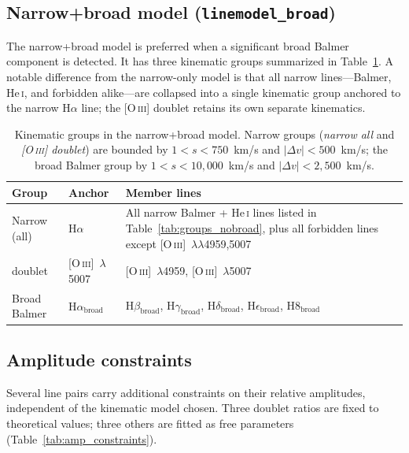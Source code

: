 \documentclass[12pt]{article}
\begin{document}
\subsection{Narrow+broad model (\texttt{linemodel\_broad})}
\label{ssec:broad}

The narrow+broad model is preferred when a significant broad Balmer
component is detected.  It has three kinematic groups summarized in
Table~\ref{tab:groups_broad}.  A notable difference from the
narrow-only model is that all narrow lines---Balmer, He\,\textsc{i},
and forbidden alike---are collapsed into a single kinematic group
anchored to the narrow H$\alpha$ line; the [O\,\textsc{iii}] doublet
retains its own separate kinematics.

\begin{table}[h]
\centering
\renewcommand{\arraystretch}{1.5}
\begin{tabular}{@{}llp{7.5cm}@{}}
\toprule
Group & Anchor & Member lines \\
\midrule
Narrow (all) & H$\alpha$
  & All narrow Balmer + He\,\textsc{i} lines listed in
    Table~\ref{tab:groups_nobroad}, plus all
    forbidden lines except [O\,\textsc{iii}]~$\lambda\lambda$4959,5007 \\[4pt]
[O\,\textsc{iii}] doublet & [O\,\textsc{iii}]~$\lambda$5007
  & [O\,\textsc{iii}]~$\lambda$4959, [O\,\textsc{iii}]~$\lambda$5007 \\[4pt]
Broad Balmer & H$\alpha_{\mathrm{broad}}$
  & H$\beta_{\mathrm{broad}}$,
    H$\gamma_{\mathrm{broad}}$,
    H$\delta_{\mathrm{broad}}$,
    H$\epsilon_{\mathrm{broad}}$,
    H8$_{\mathrm{broad}}$ \\
\bottomrule
\end{tabular}
\caption{Kinematic groups in the narrow+broad model.  Narrow groups (\emph{narrow all}
  and \emph{[O\,\textsc{iii}] doublet}) are bounded by $1 < s < 750$~km/s and
  $|\Delta v| < 500$~km/s; the broad Balmer group by $1 < s < 10{,}000$~km/s and
  $|\Delta v| < 2{,}500$~km/s.}
\label{tab:groups_broad}
\end{table}

\subsection{Amplitude constraints}
\label{ssec:amp_constraints}

Several line pairs carry additional constraints on their relative amplitudes,
independent of the kinematic model chosen.  Three doublet ratios are fixed to
theoretical values; three others are fitted as free parameters
(Table~\ref{tab:amp_constraints}).
\end{document}
